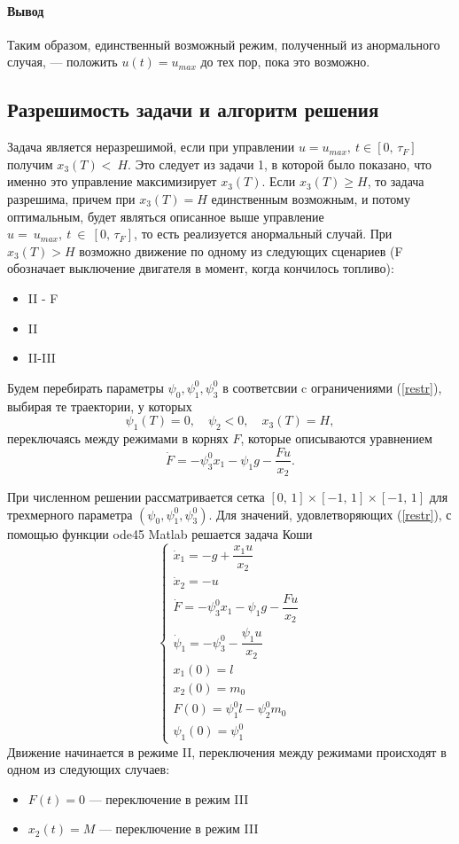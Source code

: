 \documentclass[16pt]{article}
\begin{document}
\paragraph{Вывод} Таким образом, единственный возможный режим, полученный из анормального случая, --- положить
$u(t) = u_{max}$ до тех пор, пока это возможно.

\subsection{Разрешимость задачи и алгоритм решения}
Задача является неразрешимой, если при управлении $u = u_{max}, \ t \in [0,\,\tau_F]$ получим $x_3(T) <~H$.
Это следует из задачи 1, в которой было показано, что именно это управление максимизирует $x_3(T)$. Если 
$x_3(T) \geqslant H$, то задача разрешима, причем при $x_3(T) = H$ единственным возможным, и потому оптимальным, будет
являться описанное выше управление $u =~u_{max}, \ t~\in~[0,\,\tau_F]$, то есть реализуется анормальный случай.
При $x_3(T) > H$ возможно движение по одному из следующих сценариев (F обозначает выключение двигателя в момент, когда кончилось топливо):
\begin{itemize}
\item
II - F
\item
II
\item
II-III
\end{itemize}

Будем перебирать параметры $\psi_0, \psi_1^0, \psi_3^0$ в соответсвии c ограничениями (\ref{restr}),
выбирая те траектории, у которых $$\psi_1(T) = 0,\quad \psi_2 < 0,\quad x_3(T) = H,$$
переключаясь между режимами в корнях $F$, которые описываются уравнением
$$\dot{F} = -\psi_3^0x_1 - \psi_1g - \dfrac{Fu}{x_2}.$$

При численном решении рассматривается сетка $[0,\, 1] \times [-1,\, 1] \times [-1,\,1]$ для трехмерного 
параметра $(\psi_0, \psi_1^0, \psi_3^0)$. Для значений, удовлетворяющих (\ref{restr}), с помощью функции 
ode45 Matlab решается задача Коши 
\begin{equation}
\begin{cases}
\dot{x}_1 = -g + \dfrac{x_1u}{x_2} \\
\dot{x}_2 = -u \\
\dot{F} = -\psi_3^0x_1 - \psi_1g - \dfrac{Fu}{x_2} \\
\dot{\psi}_1 = -\psi_3^0 -\dfrac{\psi_1u}{x_2} \\
x_1(0) = l \\
x_2(0) = m_0 \\
F(0) = \psi_1^0l - \psi_2^0m_0\\
\psi_1(0) = \psi_1^0
\end{cases}
\end{equation}
Движение начинается в режиме II, переключения между режимами происходят в одном из следующих случаев:
\begin{itemize}
\item
$F(t) = 0$ --- переключение в режим III
\item
$x_2(t) = M$ --- переключение в режим III
\end{itemize} 
\end{document}
